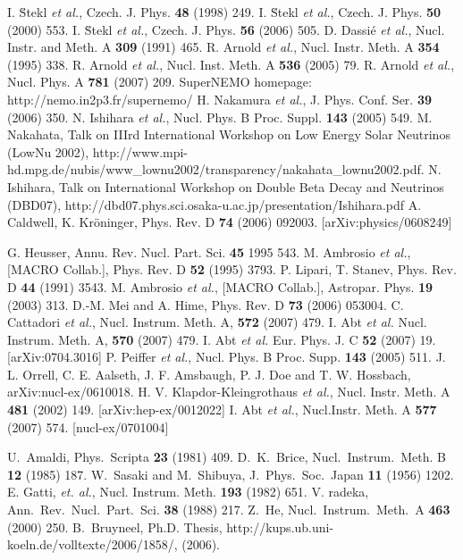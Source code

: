 \begin{thebibliography}{99}
I. \u{S}tekl \textit{et al.}, Czech. J. Phys. \textbf{48} (1998) 249.
I. \u{S}tekl \textit{et al.}, Czech. J. Phys. \textbf{50} (2000) 553.
I. \u{S}tekl \textit{et al.}, Czech. J. Phys. \textbf{56} (2006) 505.
D. Dassi\'{e} \textit{et al.}, Nucl. Instr. and Meth. A \textbf{309} (1991) 465.
R. Arnold \textit{et al.}, Nucl. Instr. Meth. A \textbf{354} (1995) 338.
R. Arnold \textit{et al.}, Nucl. Inst. Meth. A \textbf{536} (2005) 79.
R. Arnold \textit{et al.}, Nucl. Phys. A \textbf{781} (2007) 209.
SuperNEMO homepage: http://nemo.in2p3.fr/supernemo/
H. Nakamura \textit{et al.}, J. Phys. Conf. Ser. \textbf{39} (2006) 350.
N. Ishihara \textit{et al.}, Nucl. Phys. B Proc. Suppl. \textbf{143} (2005) 549.
M. Nakahata, Talk on IIIrd International Workshop on Low Energy Solar Neutrinos (LowNu 2002), http://www.mpi-hd.mpg.de/nubis/www\_lownu2002/transparency/nakahata\_lownu2002.pdf. 
N. Ishihara, Talk on International Workshop on Double Beta Decay and Neutrinos (DBD07), http://dbd07.phys.sci.osaka-u.ac.jp/presentation/Ishihara.pdf
A. Caldwell, K. Kr\"oninger, Phys. Rev. D \textbf{74}
(2006) 092003. [arXiv:physics/0608249]

G. Heusser, Annu. Rev. Nucl. Part. Sci. \textbf{45} 1995 543.
M. Ambrosio \textit{et al.}, [MACRO Collab.], Phys. Rev. D \textbf{52} (1995) 3793.
P. Lipari, T. Stanev, Phys. Rev. D \textbf{44} (1991) 3543.
M. Ambrosio \textit{et al.}, [MACRO Collab.], Astropar. Phys. \textbf{19} (2003) 313.
D.-M. Mei and A. Hime, Phys. Rev. D \textbf{73} (2006) 053004.
C. Cattadori \textit{et al.}, Nucl. Instrum. Meth. A, \textbf{572} (2007) 479.
I. Abt \textit{et al.} Nucl. Instrum. Meth. A, \textbf{570} (2007) 479.
I. Abt \textit{et al.}  Eur. Phys. J. C \textbf{52}   (2007) 19. [arXiv:0704.3016]
P. Peiffer \textit{et al.}, Nucl. Phys. B   Proc. Supp. \textbf{143} (2005) 511.
J. L. Orrell, C. E. Aalseth, J. F. Amsbaugh, P. J. Doe   and T. W. Hossbach, arXiv:nucl-ex/0610018.
H. V. Klapdor-Kleingrothaus \textit{et al.},   Nucl. Instr. Meth. A \textbf{481} (2002) 149. [arXiv:hep-ex/0012022]
I. Abt \textit{et al.}, Nucl.Instr. Meth. A \textbf{577} (2007) 574. [nucl-ex/0701004]

U.~Amaldi, Phys.~Scripta \textbf{23} (1981) 409.
D.~K.~Brice, Nucl.~Instrum.~Meth. B \textbf{12} (1985) 187.
 W.~Sasaki and M.~Shibuya, J.~Phys.~Soc.~Japan   \textbf{11} (1956) 1202.
E. Gatti, \textit{et. al.}, Nucl. Instrum. Meth.   \textbf{193} (1982) 651.
 V. radeka, Ann.~Rev.~Nucl.~Part.~Sci. \textbf{38}
  (1988) 217.
 Z.~He, Nucl.~Instrum.~Meth.~A \textbf{463} (2000) 250.
B.~Bruyneel, Ph.D. Thesis, http://kups.ub.uni-koeln.de/volltexte/2006/1858/, (2006).


\end{thebibliography}
